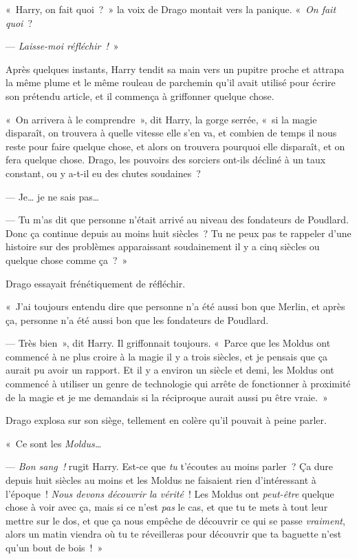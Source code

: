 «~Harry, on fait quoi~?~»
la voix de Drago montait vers la panique.
«~\emph{On fait quoi}~?

--- \emph{Laisse-moi réfléchir~!}~»

Après quelques instants, Harry tendit sa main vers un pupitre proche et attrapa la même plume et le même rouleau de parchemin qu'il avait utilisé pour écrire son prétendu article, et il commença à griffonner quelque chose.

«~On arrivera à le comprendre~», dit Harry, la gorge serrée, «~si la magie disparaît, on trouvera à quelle vitesse elle s'en va, et combien de temps il nous reste pour faire quelque chose, et alors on trouvera pourquoi elle disparaît, et on fera quelque chose.
Drago, les pouvoirs des sorciers ont-ils décliné à un taux constant, ou y a-t-il eu des chutes soudaines~?

--- Je… je ne sais pas…

--- Tu m'as dit que personne n'était arrivé au niveau des fondateurs de Poudlard.
Donc ça continue depuis au moins huit siècles~?
Tu ne peux pas te rappeler d'une histoire sur des problèmes apparaissant soudainement il y a cinq siècles ou quelque chose comme ça~?~»

Drago essayait frénétiquement de réfléchir.

«~J'ai toujours entendu dire que personne n'a été aussi bon que Merlin, et après ça, personne n'a été aussi bon que les fondateurs de Poudlard.

--- Très bien~», dit Harry.
Il griffonnait toujours.
«~Parce que les Moldus ont commencé à ne plus croire à la magie il y a trois siècles, et je pensais que ça aurait pu avoir un rapport.
Et il y a environ un siècle et demi, les Moldus ont commencé à utiliser un genre de technologie qui arrête de fonctionner à proximité de la magie et je me demandais si la réciproque aurait aussi pu être vraie.~»

Drago explosa sur son siège, tellement en colère qu'il pouvait à peine parler.

«~Ce sont les \emph{Moldus…}

--- \emph{Bon sang~!} rugit Harry.
Est-ce que \emph{tu} t'écoutes au moins parler~?
Ça dure depuis huit siècles au moins et les Moldus ne faisaient rien d'intéressant à l'époque~!
\emph{Nous devons découvrir la vérité}~!
Les Moldus ont \emph{peut-être} quelque chose à voir avec ça, mais si ce n'est \emph{pas} le cas, et que tu te mets à tout leur mettre sur le dos, et que ça nous empêche de découvrir ce qui se passe \emph{vraiment}, alors un matin viendra où tu te réveilleras pour découvrir que ta baguette n'est qu'un bout de bois~!~»

